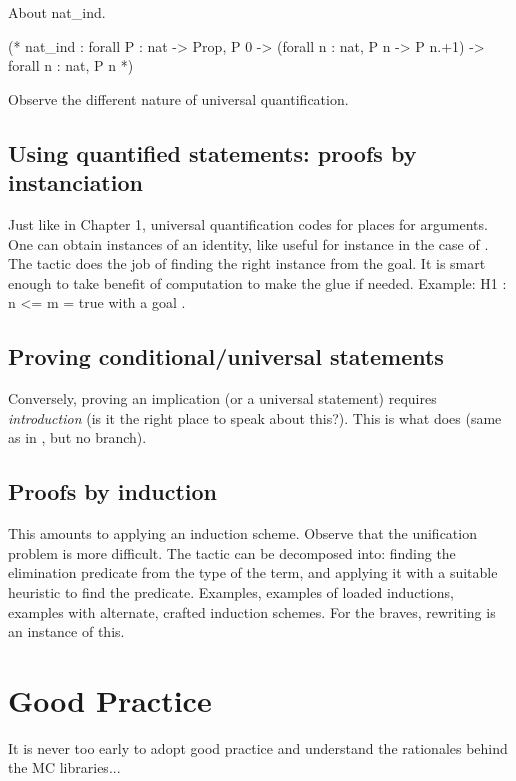 \begin{coq}{}{}
About nat_ind.

(* nat_ind :
forall P : nat -> Prop,
P 0 -> (forall n : nat, P n -> P n.+1) -> forall n : nat, P n *)
\end{coq}

Observe the different nature of universal quantification.

\subsection{Using quantified statements: proofs by instanciation}

Just like in Chapter 1, universal quantification codes for places for
arguments. One can obtain instances of an identity, like
 useful for instance in the case of . The
 tactic does the job of finding the right instance from the
goal.  It is smart enough to take benefit of computation to make the
glue if needed. Example: {H1 : n <= m = true} with a goal
.

\subsection{Proving conditional/universal statements}

Conversely, proving an implication (or a universal statement) requires
\emph{introduction} (is it the right place to speak about this?). This
is what  does (same as in , but no branch).

\subsection{Proofs by induction}\label{ssec:ind}

This amounts to applying an induction scheme. Observe that the
unification problem is more difficult. The 
tactic can be decomposed into: finding the elimination predicate from
the type of the term, and applying it with a suitable heuristic to
find the predicate. Examples, examples of loaded inductions, examples
with alternate, crafted induction schemes. For the braves, rewriting
is an instance of this.



\section{Good Practice}\label{sec:goodprac}
It is never too early to adopt good practice and understand the
rationales behind the MC libraries...

